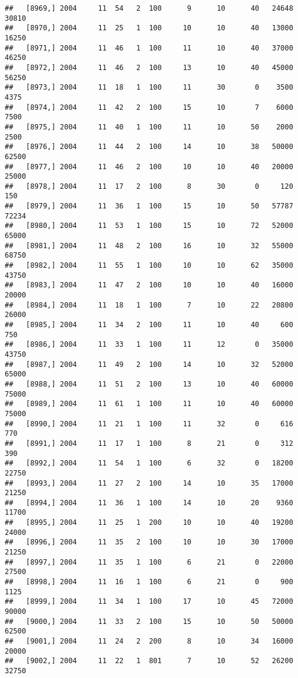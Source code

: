\documentclass{article}\usepackage[]{graphicx}\usepackage[]{color}
\makeatletter
\newenvironment{kframe}{%
 \def\at@end@of@kframe{}%
 \ifinner\ifhmode%
  \def\at@end@of@kframe{\end{minipage}}%
  \begin{minipage}{\columnwidth}%
 \fi\fi%
 \def\FrameCommand##1{\hskip\@totalleftmargin \hskip-\fboxsep
 \colorbox{shadecolor}{##1}\hskip-\fboxsep
     \hskip-\linewidth \hskip-\@totalleftmargin \hskip\columnwidth}%
 \MakeFramed {\advance\hsize-\width
   \@totalleftmargin\z@ \linewidth\hsize
   \@setminipage}}%
 {\par\unskip\endMakeFramed%
 \at@end@of@kframe}
\newenvironment{knitrout}{}{} %
\makeatother
\begin{document}
\begin{knitrout}
\begin{kframe}
\begin{verbatim}
##   [8969,] 2004     11  54   2  100      9      10      40   24648   30810
##   [8970,] 2004     11  25   1  100     10      10      40   13000   16250
##   [8971,] 2004     11  46   1  100     11      10      40   37000   46250
##   [8972,] 2004     11  46   2  100     13      10      40   45000   56250
##   [8973,] 2004     11  18   1  100     11      30       0    3500    4375
##   [8974,] 2004     11  42   2  100     15      10       7    6000    7500
##   [8975,] 2004     11  40   1  100     11      10      50    2000    2500
##   [8976,] 2004     11  44   2  100     14      10      38   50000   62500
##   [8977,] 2004     11  46   2  100     10      10      40   20000   25000
##   [8978,] 2004     11  17   2  100      8      30       0     120     150
##   [8979,] 2004     11  36   1  100     15      10      50   57787   72234
##   [8980,] 2004     11  53   1  100     15      10      72   52000   65000
##   [8981,] 2004     11  48   2  100     16      10      32   55000   68750
##   [8982,] 2004     11  55   1  100     10      10      62   35000   43750
##   [8983,] 2004     11  47   2  100     10      10      40   16000   20000
##   [8984,] 2004     11  18   1  100      7      10      22   20800   26000
##   [8985,] 2004     11  34   2  100     11      10      40     600     750
##   [8986,] 2004     11  33   1  100     11      12       0   35000   43750
##   [8987,] 2004     11  49   2  100     14      10      32   52000   65000
##   [8988,] 2004     11  51   2  100     13      10      40   60000   75000
##   [8989,] 2004     11  61   1  100     11      10      40   60000   75000
##   [8990,] 2004     11  21   1  100     11      32       0     616     770
##   [8991,] 2004     11  17   1  100      8      21       0     312     390
##   [8992,] 2004     11  54   1  100      6      32       0   18200   22750
##   [8993,] 2004     11  27   2  100     14      10      35   17000   21250
##   [8994,] 2004     11  36   1  100     14      10      20    9360   11700
##   [8995,] 2004     11  25   1  200     10      10      40   19200   24000
##   [8996,] 2004     11  35   2  100     10      10      30   17000   21250
##   [8997,] 2004     11  35   1  100      6      21       0   22000   27500
##   [8998,] 2004     11  16   1  100      6      21       0     900    1125
##   [8999,] 2004     11  34   1  100     17      10      45   72000   90000
##   [9000,] 2004     11  33   2  100     15      10      50   50000   62500
##   [9001,] 2004     11  24   2  200      8      10      34   16000   20000
##   [9002,] 2004     11  22   1  801      7      10      52   26200   32750

\end{verbatim}
\end{kframe}
\end{knitrout}
\end{document}
